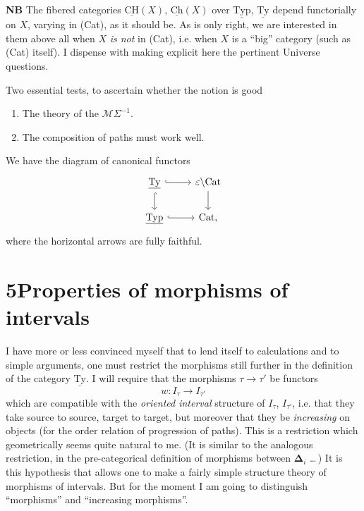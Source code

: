 \documentclass[11pt]{article}
\newcommand{\printedpage}[1]{\marginpar{\footnotesize p.~#1}}
\newcommand{\msp}[1]{\marginpar{\footnotesize [#1]}}
\newcommand{\ul}[1]{\underline{\mathrm{#1}}}
\newcommand{\bDelta}{\boldsymbol{\Delta}}
\begin{document}
\textbf{NB} The fibered categories $\ul{CH}(X)$, $\ul{Ch}(X)$ over $\ul{Typ}$, $\ul{Ty}$ depend functorially on $X$, varying in (Cat), as it should be. As is only right, we are interested in them above all when $X$ \textit{is not} in (Cat), i.e. when $X$ is a ``big'' category (such as (Cat) itself). I dispense with making explicit here the pertinent Universe questions.

Two essential tests, to ascertain whether the notion is good
\begin{enumerate}
\item[a)] The theory of the $\mathcal{M}\Sigma^{-1}$.
\item[b)] The composition of paths must work well.
\end{enumerate}

\msp{page 31}
We have the diagram of canonical functors
\[
\begin{tikzcd}
\ul{Ty} \arrow[r, hook] \arrow[d, hook] & \varepsilon\backslash\mathrm{Cat} \arrow[d] \\
\ul{Typ} \arrow[r, hook] & \mathrm{Cat},
\end{tikzcd}
\]
where the horizontal arrows are fully faithful.

\printedpage{21}

\section*{5\quad Properties of morphisms of intervals}

I have more or less convinced myself that to lend itself to calculations and to simple arguments, one must restrict the morphisms still further in the definition of the category $\ul{Ty}$. I will require that the morphisms $\tau\longrightarrow\tau'$ be functors
\[
w : I_\tau\longrightarrow I_{\tau'}
\]
which are compatible with the \textit{oriented interval} structure of $I_\tau$, $I_{\tau'}$, i.e. that they take source to source, target to target, but moreover that they be \textit{increasing} on objects (for the order relation of progression of paths). This is a restriction which geometrically seems quite natural to me. (It is similar to the analogous restriction, in the pre-categorical definition of morphisms between $\bDelta_i$ \ldots\,) It is this hypothesis that allows one to make a fairly simple structure theory of morphisms of intervals. But for the moment I am going to distinguish ``morphisms'' and ``increasing morphisms''.
\end{document}
